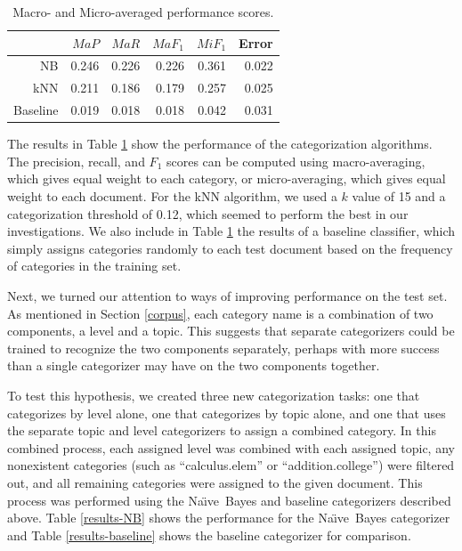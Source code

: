 \documentclass{article}
\newcommand{\naive}{Na\"\i ve}
\begin{document}
\begin{table}
\begin{tabular}{|r|r|r|r|r|r|}
\hline
         & $MaP$   & $MaR$   & $MaF_1$ & $MiF_1$ & Error \\ \hline
NB       & 0.246   & 0.226   & 0.226   & 0.361   & 0.022 \\ \hline
kNN      & 0.211   & 0.186   & 0.179   & 0.257   & 0.025 \\ \hline
Baseline & 0.019   & 0.018   & 0.018   & 0.042   & 0.031 \\ \hline
\end{tabular}
\caption{Macro- and Micro-averaged performance scores.}
\label{results-main}
\end{table}

The results in Table \ref{results-main} show the performance of the
categorization algorithms.  The precision, recall, and $F_1$ scores
can be computed using macro-averaging, which gives equal weight to
each category, or micro-averaging, which gives equal weight to each
document. \cite{yang:99, sebastiani:02} For the kNN algorithm, we used
a $k$ value of 15 and a categorization threshold of 0.12, which seemed
to perform the best in our investigations.  We also include in Table
\ref{results-main} the results of a baseline classifier, which simply
assigns categories randomly to each test document based on the
frequency of categories in the training set.

Next, we turned our attention to ways of improving performance on the
test set.  As mentioned in Section \ref{corpus}, each category name is
a combination of two components, a level and a topic.  This suggests
that separate categorizers could be trained to recognize the two
components separately, perhaps with more success than a single
categorizer may have on the two components together.

To test this hypothesis, we created three new categorization tasks:
one that categorizes by level alone, one that categorizes by topic
alone, and one that uses the separate topic and level categorizers to
assign a combined category.  In this combined process, each assigned
level was combined with each assigned topic, any nonexistent
categories (such as ``calculus.elem'' or ``addition.college'') were
filtered out, and all remaining categories were assigned to the given
document.  This process was performed using the \naive\ Bayes and
baseline categorizers described above.  Table \ref{results-NB} shows
the performance for the \naive\ Bayes categorizer and Table
\ref{results-baseline} shows the baseline categorizer for comparison.
\end{document}
